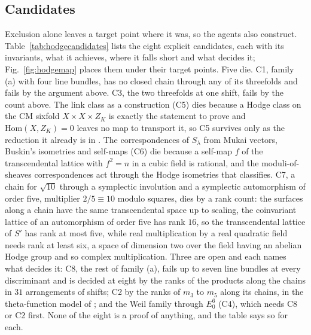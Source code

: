 \subsection{Candidates}\label{ssec:hodgecandidates}

Exclusion alone leaves a target point where it was, so the agents also construct. Table~\ref{tab:hodgecandidates} lists the eight explicit candidates, each with its invariants, what it achieves, where it falls short and what decides it; Fig.~\ref{fig:hodgemap} places them under their target points. Five die. C1, family (a) with four line bundles, has no closed chain through any of its threefolds and fails by the argument above. C3, the two threefolds at one shift, fails by the count above. The link class as a construction (C5) dies because a Hodge class on the CM sixfold $X\times X\times Z_{K}$ is exactly the statement to prove and $\mathrm{Hom}(X,Z_{K})=0$ leaves no map to transport it, so C5 survives only as the reduction it already is in \cite{BB26c}. The correspondences of $S_{\lambda}$ from Mukai vectors, Buskin's isometries and self-maps (C6) die because a self-map $f$ of the transcendental lattice with $f^{2}=n$ in a cubic field is rational, and the moduli-of-sheaves correspondences act through the Hodge isometries that \cite{BB26c} classifies. C7, a chain for $\sqrt{10}$ through a symplectic involution and a symplectic automorphism of order five, multiplier $2/5\equiv10$ modulo squares, dies by a rank count: the surfaces along a chain have the same transcendental space up to scaling, the coinvariant lattice of an automorphism of order five has rank $16$, so the transcendental lattice of $S'$ has rank at most five, while real multiplication by a real quadratic field needs rank at least six, a space of dimension two over the field having an abelian Hodge group and so complex multiplication. Three are open and each names what decides it: C8, the rest of family (a), fails up to seven line bundles at every discriminant and is decided at eight by the ranks of the products along the chains in $31$ arrangements of shifts; C2 by the ranks of $m_{3}$ to $m_{5}$ along its chains, in the theta-function model of \cite{BMB26b}; and the Weil family through $E_{0}^{6}$ (C4), which needs C8 or C2 first. None of the eight is a proof of anything, and the table says so for each.


